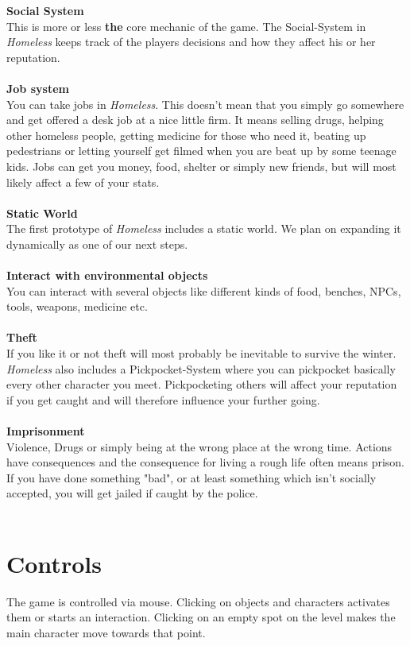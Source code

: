\documentclass[a4paper]{scrreprt}
\begin{document}
\textbf{Social System}\\
This is more or less \textbf{the} core mechanic of the game. The Social-System in \textit{Homeless} keeps track of the players decisions and how they affect his or her reputation.\\
\\
\textbf{Job system}\\
You can take jobs in \textit{Homeless}. This doesn't mean that you simply go somewhere and get offered a desk job at a nice little firm. It means selling drugs, helping other homeless people, getting medicine for those who need it, beating up pedestrians or letting yourself get filmed when you are beat up by some teenage kids. Jobs can get you money, food, shelter or simply new friends, but will most likely affect a few of your stats.\\
\\
\textbf{Static World}\\
The first prototype of \textit{Homeless} includes a static world. We plan on expanding it dynamically as one of our next steps.\\
\\
\textbf{Interact with environmental objects}\\
You can interact with several objects like different kinds of food, benches, NPCs, tools, weapons, medicine etc.\\
\\
\textbf{Theft}\\
If you like it or not theft will most probably be inevitable to survive the winter.\\
\textit{Homeless} also includes a Pickpocket-System where you can pickpocket basically every other character you meet. Pickpocketing others will affect your reputation if you get caught and will therefore influence your further going.\\
\\
\textbf{Imprisonment}\\
Violence, Drugs or simply being at the wrong place at the wrong time. Actions have consequences and the consequence for living a rough life often means prison. If you have done something "bad", or at least something which isn't socially accepted, you will get jailed if caught by the police.\\
\\

\section{Controls}
The game is controlled via mouse. Clicking on objects and characters activates them or starts an interaction. Clicking on an empty spot on the level makes the main character move towards that point.
\end{document}
